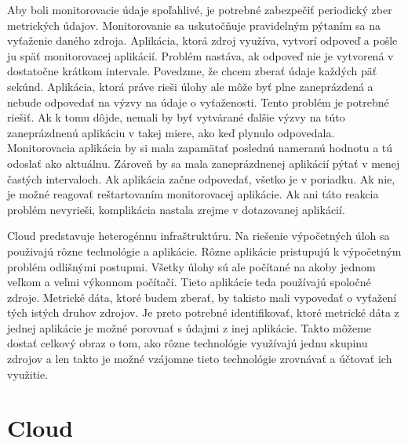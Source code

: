 \documentclass[11pt,final,oneside]{fithesis}
\begin{document}
Aby boli monitorovacie údaje spoľahlivé, je potrebné zabezpečiť periodický zber metrických údajov. Monitorovanie sa uskutočňuje pravidelným pýtaním sa na vyťaženie daného zdroja. Aplikácia, ktorá zdroj
využíva, vytvorí odpoveď a pošle ju späť monitorovacej aplikácií. Problém nastáva, ak odpoveď nie je vytvorená v dostatočne krátkom intervale. Povedzme, že chcem zberať údaje každých päť sekúnd. Aplikácia,
ktorá práve rieši úlohy ale môže byť plne zaneprázdená a nebude odpovedať na výzvy na údaje o vyťaženosti. Tento problém je potrebné riešiť. Ak k tomu dôjde, nemali by byť vytvárané ďalšie výzvy na túto
zaneprázdnenú aplikáciu v takej miere, ako keď plynulo odpovedala. Monitorovacia aplikácia by si mala zapamätať poslednú nameranú hodnotu a tú odoslať ako aktuálnu. Zároveň by sa mala zaneprázdnenej aplikácií
pýtať v menej častých intervaloch. Ak aplikácia začne odpovedať, všetko je v poriadku. Ak nie, je možné reagovať reštartovaním monitorovacej aplikácie. Ak ani táto reakcia problém nevyrieši, komplikácia 
nastala zrejme v dotazovanej aplikácií.

Cloud predstavuje heterogénnu infraštruktúru. Na riešenie výpočetných úloh sa použivajú rôzne technológie a aplikácie. Rôzne aplikácie pristupujú k výpočetným problém odlišnými postupmi. Všetky úlohy 
sú ale počítané na akoby jednom veľkom a veľmi výkonnom počítači. Tieto aplikácie teda používajú spoločné zdroje. Metrické dáta, ktoré budem zberať, by takisto mali vypovedať o vyťažení tých istých druhov 
zdrojov. Je preto potrebné identifikovať, ktoré metrické dáta z jednej aplikácie je možné porovnať s údajmi z inej aplikácie. Takto môžeme dostať celkový obraz o tom, ako rôzne technológie využívajú
jednu skupinu zdrojov a len takto je možné vzájomne tieto technológie zrovnávať a účtovať ich využitie. 



\chapter{Cloud}
\end{document}
